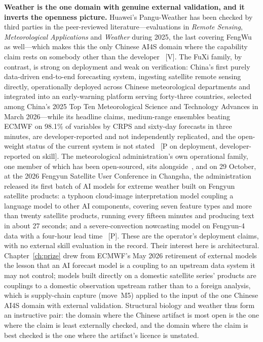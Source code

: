 \textbf{Weather is the one domain with genuine external validation, and it inverts the openness picture.} Huawei's Pangu-Weather has been checked by third parties in the peer-reviewed literature---evaluations in \emph{Remote Sensing}, \emph{Meteorological Applications} and \emph{Weather} during 2025, the last covering FengWu as well---which makes this the only Chinese AI4S domain where the capability claim rests on somebody other than the developer~\cite{fuxi-weather} [V]. The FuXi family, by contrast, is strong on deployment and weak on verification: China's first purely data-driven end-to-end forecasting system, ingesting satellite remote sensing directly, operationally deployed across Chinese meteorological departments and integrated into an early-warning platform serving forty-three countries, selected among China's 2025 Top Ten Meteorological Science and Technology Advances in March 2026---while its headline claims, medium-range ensembles beating ECMWF on 98.1\% of variables by CRPS and sixty-day forecasts in three minutes, are developer-reported and not independently replicated, and the open-weight status of the current system is not stated~\cite{fuxi-weather} [P on deployment, developer-reported on skill]. The meteorological administration's own operational family, one member of which has been open-sourced, sits alongside~\cite{cma-ai}, and on 29 October, at the 2026 Fengyun Satellite User Conference in Changsha, the administration released its first batch of AI models for extreme weather built on Fengyun satellite products: a typhoon cloud-image interpretation model coupling a language model to other AI components, covering seven feature types and more than twenty satellite products, running every fifteen minutes and producing text in about 27 seconds; and a severe-convection nowcasting model on Fengyun-4 data with a four-hour lead time~\cite{sci-cma-fengyun} [P]. These are the operator's deployment claims, with no external skill evaluation in the record. Their interest here is architectural. Chapter~\ref{ch:prize} drew from ECMWF's May 2026 retirement of external models the lesson that an AI forecast model is a coupling to an upstream data system it may not control; models built directly on a domestic satellite series' products are couplings to a domestic observation upstream rather than to a foreign analysis, which is supply-chain capture (move~M5) applied to the input of the one Chinese AI4S domain with external validation. Structural biology and weather thus form an instructive pair: the domain where the Chinese artifact is most open is the one where the claim is least externally checked, and the domain where the claim is best checked is the one where the artifact's licence is unstated.

